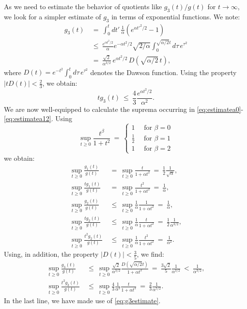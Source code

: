 \documentclass[b5paper,draft,openbib,12pt]{memoir}
\begin{document}
As we need to estimate the behavior of quotients like $g_3(t)/g(t)$ 
for $t\rightarrow \infty$, we look for a simpler estimate of $g_3$ 
in terms of exponential functions. We note:
\begin{align}
	g_3(t) ~&=~ \int_0^t dt'\,  \frac{1}{\alpha} \left( e^{\alpha {t'}^2/2} -1\right)\nonumber\\
	&\le~ \frac{e^{\alpha t^2/2}}{\alpha} e^{-\alpha t^2/2} \sqrt{2/\alpha} \int_0^{\sqrt{\alpha/2} t}  d\tau  \,e^{\tau^2}\nonumber\\
	&=~\frac{\sqrt{2}}{\alpha^{3/2}} \, e^{\alpha t^2/2} \, D(\sqrt{\alpha/2}\,t),
\end{align}
where $D(t) = e^{-t^2}\int_0^{t}  d\tau \, e^{\tau^2}$ denotes the 
Dawson function.
Using the property \(|tD(t)|<\frac{2}{3}\), we obtain:
\begin{equation}
	t g_3(t)~\leq~\frac{4}{3} \frac{e^{\alpha t^2/2}}{\alpha^{2}}.
\label{eq:g3estimate}
\end{equation}
We are now well-equipped to calculate the suprema occurring in 
\eqref{eq:estimatea0}-\eqref{eq:estimatea12}. Using
\begin{equation}
 \sup_{t\geq 0}\frac{t^\beta}{1+t^2} ~=~ \left\{ \begin{matrix} 1\quad \text{ for } \beta=0\\ \frac{1}{2} \quad \text{ for } \beta=1 \\ 1\quad \text{ for } \beta=2 \end{matrix}\right. 
\end{equation}
we obtain:
\begin{align}
	\sup_{t\geq 0} \frac{g_1(t)}{g(t)} ~&=~ \sup_{t\geq 0} \frac{t}{1+\alpha t^2} ~=~ \frac{1}{2}\frac{1}{\sqrt{\alpha}},\label{eq:sup1}\\
	\sup_{t\geq 0} \frac{t g_1(t)}{g(t)} ~&=~ \sup_{t\geq 0} \frac{t^2}{1+\alpha t^2} ~=~ \frac{1}{\alpha},\label{eq:sup2}\\
	\sup_{t\geq 0} \frac{g_2(t)}{g(t)} ~&\leq~ \sup_{t\geq 0} \frac{1}{\alpha} \frac{1}{1+\alpha t^2} ~=~ \frac{1}{\alpha},\label{eq:sup3}\\
\sup_{t\geq 0} \frac{tg_2(t)}{g(t)} ~&\leq~ \sup_{t\geq 0} \frac{1}{\alpha} \frac{t}{1+\alpha t^2} ~=~ \frac{1}{2}\frac{1}{\alpha^{3/2}},\label{eq:sup4}\\
\sup_{t\geq 0} \frac{t^2g_2(t)}{g(t)} ~&\leq~ \sup_{t\geq 0} \frac{1}{\alpha} \frac{t^2}{1+\alpha t^2} ~=~ \frac{1}{\alpha^2}\label{eq:sup5}.
\end{align}
Using, in addition, the property $|D(t)| < \frac{3}{5}$, we find:
\begin{align}
	\sup_{t\geq 0} \frac{g_3(t)}{g(t)} ~&\leq~ \sup_{t\geq 0} \frac{\sqrt{2}}{\alpha^{3/2}} \frac{D(\sqrt{\alpha/2}t)}{1+\alpha t^2} ~=~ \frac{3\sqrt{2}}{5}\frac{1}{\alpha^{3/2}} ~<~ \frac{1}{\alpha^{3/2}},\label{eq:sup6}\\
\sup_{t\geq 0} \frac{t^2 g_3(t)}{g(t)} ~&\leq~ \sup_{t\geq 0} \frac{4}{3}\frac{1}{\alpha^2} \frac{t}{1+\alpha t^2} ~=~\frac{2}{3}\frac{1}{\alpha^{5/2}}. \label{eq:sup7}
\end{align}
In the last line, we have made use of \eqref{eq:g3estimate}.
\end{document}
